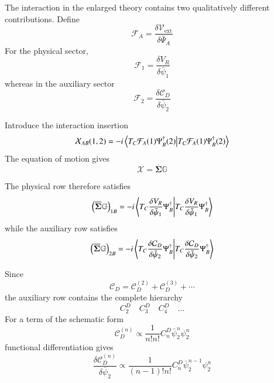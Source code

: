 \documentclass[aip,jcp,reprint,noshowkeys,superscriptaddress]{revtex4-1}
\begin{document}
The interaction in the enlarged theory contains two qualitatively
different contributions.  Define
\begin{equation}
  \mathcal F_A
  =
  \frac{
    \delta \mathcal V_{\mathrm{ext}}
  }{
    \delta\bar\Psi_A
  }
\end{equation}
For the physical sector,
\begin{equation}
  \mathcal F_1
  =
  \frac{
    \delta V_R
  }{
    \delta\bar\psi_1
  }
\end{equation}
whereas in the auxiliary sector
\begin{equation}
  \mathcal F_2
  =
  \frac{
    \delta\mathcal C_D
  }{
    \delta\bar\psi_2
  }
\end{equation}

Introduce the interaction insertion
\begin{equation}
  \mathcal X_{AB}(1,2)
  =
  -i
  \braket{
    T_C
    \mathcal F_A(1)
    \Psi_B^\dagger(2)
  }
\end{equation}
The equation of motion gives
\begin{equation}
  \mathcal X
  =
  \overline{\boldsymbol\Sigma}
  \mathbb G
  \label{eq:super-sd-master}
\end{equation}

The physical row therefore satisfies
\begin{equation}
  \left(
    \overline{\boldsymbol\Sigma}
    \mathbb G
  \right)_{1B}
  =
  -i
  \braket{
    T_C
    \frac{
      \delta V_R
    }{
      \delta\bar\psi_1
    }
    \Psi_B^\dagger
  }
  \label{eq:physical-sd-row}
\end{equation}
while the auxiliary row satisfies
\begin{equation}
  \left(
    \overline{\boldsymbol\Sigma}
    \mathbb G
  \right)_{2B}
  =
  -i
  \braket{
    T_C
    \frac{
      \delta\mathcal C_D
    }{
      \delta\bar\psi_2
    }
    \Psi_B^\dagger
  }
  \label{eq:auxiliary-sd-row}
\end{equation}

Since
\begin{equation}
  \mathcal C_D
  =
  \mathcal C_D^{(2)}
  +
  \mathcal C_D^{(3)}
  +
  \cdots
\end{equation}
the auxiliary row contains the complete hierarchy
\begin{equation}
  C_2^D
  \quad
  C_3^D
  \quad
  C_4^D
  \quad
  \ldots
\end{equation}
For a term of the schematic form
\begin{equation}
  \mathcal C_D^{(n)}
  \propto
  \frac{1}{n!n!}
  C_n^D
  \bar\psi_2^n
  \psi_2^n
\end{equation}
functional differentiation gives
\begin{equation}
  \frac{
    \delta\mathcal C_D^{(n)}
  }{
    \delta\bar\psi_2
  }
  \propto
  \frac{1}{(n-1)!n!}
  C_n^D
  \bar\psi_2^{n-1}
  \psi_2^n
\end{equation}
\end{document}
